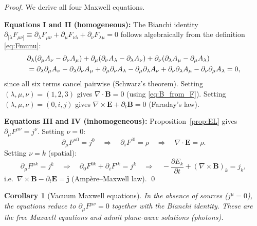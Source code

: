 \documentclass[11pt,a4paper]{article}
\newtheorem{corollary}{Corollary}
\begin{document}
\begin{proof}
We derive all four Maxwell equations.

\medskip
\noindent\textbf{Equations I and II (homogeneous):}
The Bianchi identity
$\partial_{[\lambda}F_{\mu\nu]} \equiv \partial_\lambda F_{\mu\nu}
+ \partial_\mu F_{\nu\lambda} + \partial_\nu F_{\lambda\mu} = 0$
follows algebraically from the definition \eqref{eq:Fmunu}:
\begin{align}
  &\partial_\lambda(\partial_\mu A_\nu - \partial_\nu A_\mu)
  + \partial_\mu(\partial_\nu A_\lambda - \partial_\lambda A_\nu)
  + \partial_\nu(\partial_\lambda A_\mu - \partial_\mu A_\lambda) \notag \\
  &= \partial_\lambda\partial_\mu A_\nu - \partial_\lambda\partial_\nu A_\mu
   + \partial_\mu\partial_\nu A_\lambda - \partial_\mu\partial_\lambda A_\nu
   + \partial_\nu\partial_\lambda A_\mu - \partial_\nu\partial_\mu A_\lambda
  = 0,
\end{align}
since all six terms cancel pairwise (Schwarz's theorem).
Setting $(\lambda,\mu,\nu) = (1,2,3)$ gives $\nabla\cdot\mathbf{B} = 0$
(using \eqref{eq:B_from_F}).
Setting $(\lambda,\mu,\nu) = (0,i,j)$ gives
$\nabla\times\mathbf{E} + \partial_t\mathbf{B} = 0$
(Faraday's law).

\medskip
\noindent\textbf{Equations III and IV (inhomogeneous):}
Proposition~\ref{prop:EL} gives $\partial_\mu F^{\mu\nu} = j^\nu$.
Setting $\nu = 0$:
\begin{equation}
  \partial_\mu F^{\mu 0} = j^0
  \quad\Rightarrow\quad
  \partial_i F^{i0} = \rho
  \quad\Rightarrow\quad
  \nabla\cdot\mathbf{E} = \rho.
\end{equation}
Setting $\nu = k$ (spatial):
\begin{equation}
  \partial_\mu F^{\mu k} = j^k
  \quad\Rightarrow\quad
  \partial_0 F^{0k} + \partial_i F^{ik} = j^k
  \quad\Rightarrow\quad
  -\frac{\partial E_k}{\partial t} + (\nabla\times\mathbf{B})_k = j_k,
\end{equation}
i.e.\ $\nabla\times\mathbf{B} - \partial_t\mathbf{E} = \mathbf{j}$
(Ampère--Maxwell law).
\qed
\end{proof}

\begin{corollary}[Vacuum Maxwell equations]
In the absence of sources ($j^\mu = 0$), the equations reduce to
$\partial_\mu F^{\mu\nu} = 0$ together with the Bianchi identity.
These are the free Maxwell equations and admit plane-wave solutions
(photons).
\end{corollary}
\end{document}
